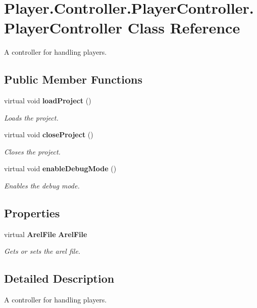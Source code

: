 \section{Player.\-Controller.\-Player\-Controller.\-Player\-Controller Class Reference}
\label{class_player_1_1_controller_1_1_player_controller_1_1_player_controller}


A controller for handling players.  


\subsection*{Public Member Functions}
\begin{DoxyCompactItemize}
\item 
virtual void {\bf load\-Project} ()
\begin{DoxyCompactList}\small\item\em Loads the project. \end{DoxyCompactList}\item 
virtual void {\bf close\-Project} ()
\begin{DoxyCompactList}\small\item\em Closes the project. \end{DoxyCompactList}\item 
virtual void {\bf enable\-Debug\-Mode} ()
\begin{DoxyCompactList}\small\item\em Enables the debug mode. \end{DoxyCompactList}\end{DoxyCompactItemize}
\subsection*{Properties}
\begin{DoxyCompactItemize}
\item 
virtual {\bf Arel\-File} {\bf Arel\-File}\hspace{0.3cm}{\ttfamily  [get, set]}
\begin{DoxyCompactList}\small\item\em Gets or sets the arel file. \end{DoxyCompactList}\end{DoxyCompactItemize}


\subsection{Detailed Description}
A controller for handling players. 

